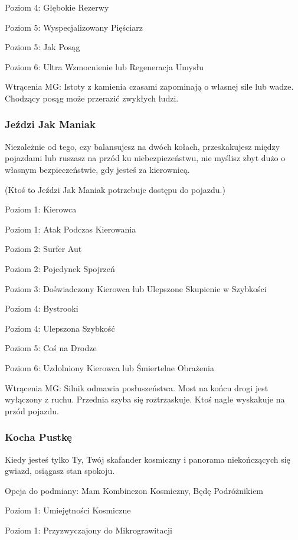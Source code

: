 Poziom 4: Głębokie Rezerwy

Poziom 5: Wyspecjalizowany Pięściarz

Poziom 5: Jak Posąg

Poziom 6: Ultra Wzmocnienie lub Regeneracja Umysłu

Wtrącenia MG: Istoty z kamienia czasami zapominają o własnej sile lub wadze. Chodzący posąg może przerazić zwykłych ludzi.

\subsubsection{Jeździ Jak Maniak}

Niezależnie od tego, czy balansujesz na dwóch kołach, przeskakujesz między pojazdami lub ruszasz na przód ku niebezpiezeństwu, nie myślisz zbyt dużo o własnym bezpieczeństwie, gdy jesteś za kierownicą.  

(Ktoś to Jeździ Jak Maniak potrzebuje dostępu do pojazdu.)

Poziom 1: Kierowca

Poziom 1: Atak Podczas Kierowania

Poziom 2: Surfer Aut

Poziom 2: Pojedynek Spojrzeń

Poziom 3: Doświadczony Kierowca lub Ulepszone Skupienie w Szybkości

Poziom 4: Bystrooki

Poziom 4: Ulepszona Szybkość

Poziom 5: Coś na Drodze

Poziom 6: Uzdolniony Kierowca lub Śmiertelne Obrażenia

Wtrącenia MG: Silnik odmawia posłuszeństwa. Most na końcu drogi jest wyłączony z ruchu. Przednia szyba się roztrzaskuje. Ktoś nagle wyskakuje na przód pojazdu.

\subsubsection{Kocha Pustkę}

Kiedy jesteś tylko Ty, Twój skafander kosmiczny i panorama niekończących się gwiazd, osiągasz stan spokoju.

Opcja do podmiany: Mam Kombinezon Kosmiczny, Będę Podróżnikiem 

Poziom 1: Umiejętności Kosmiczne

Poziom 1: Przyzwyczajony do Mikrograwitacji

